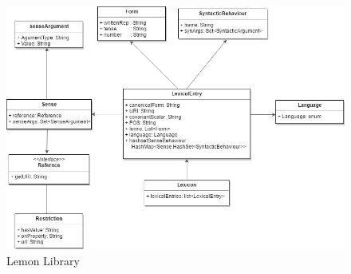 \begin{figure}[H]
   \centering
    \includegraphics[scale=0.5]{./fig/lemon}
     \caption{Lemon Library}
    \label{fig: lemon}
\end{figure}

